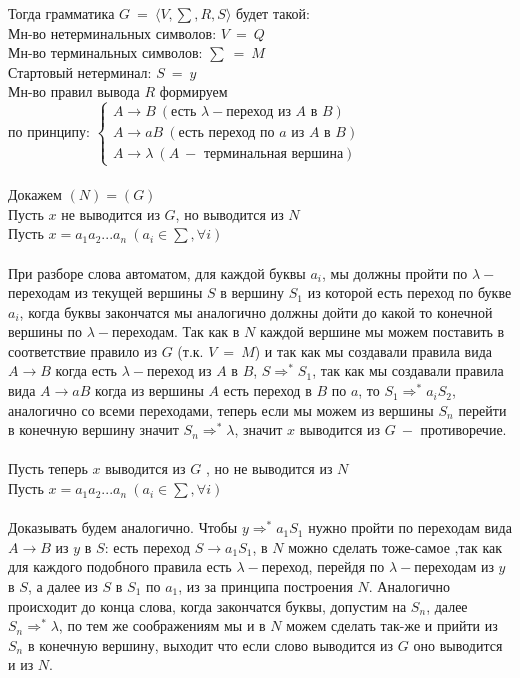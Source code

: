 \documentclass[10pt]{article}
\begin{document}
{\begin{enumerate}
		Тогда грамматика $G\ =\ \langle V,\sum,R,S\rangle$ будет такой:\\
		Мн-во нетерминальных символов: $V\ =\ Q$\\
		Мн-во терминальных символов: $\sum\ =\ M$\\
		Стартовый нетерминал: $S\ =\ y$\\
		Мн-во правил вывода $R$ формируем\\по принципу: $\begin{cases} A\rightarrow B\ (\text{есть }\lambda-\text{переход из }A\text{ в }B)\\A\rightarrow aB\ (\text{есть переход по } a\text{ из }A\text{ в }B)\\A\rightarrow\lambda\ (A\ -\text{ терминальная вершина}) \end{cases}$\\\\
		Докажем $(N)=(G)$\\
		Пусть $x$ не выводится из $G$, но выводится из $N$\\
		Пусть $x=a_1a_2...a_n\ (a_i \in \sum, \forall i)$\\\\
		При разборе слова автоматом, для каждой буквы $a_i$, мы должны пройти по $\lambda-$переходам из текущей вершины $S$ в вершину $S_1$ из которой есть переход по букве $a_i$, когда буквы закончатся мы аналогично должны дойти до какой то конечной вершины по $\lambda-$переходам.
		Так как в $N$ каждой вершине мы можем поставить в соответствие правило из $G$ (т.к. $V\ =\ M$) и так как мы создавали правила вида $A\rightarrow B$ когда есть $\lambda-$переход из $A$ в $B$, $S\Rightarrow^*S_1$, так как мы создавали правила вида $A\rightarrow aB$ когда из вершины $A$ есть переход в $B$ по $a$, то $S_1\Rightarrow^*a_iS_2$, аналогично со всеми переходами, теперь если мы можем из вершины $S_n$ перейти в конечную вершину значит $S_n\Rightarrow^*\lambda$, значит $x$ выводится из $G\ -$ противоречие.\\\\
		Пусть теперь $x$ выводится из $G$ , но не выводится из $N$\\
		Пусть $x=a_1a_2...a_n\ (a_i \in \sum, \forall i)$\\\\
		Доказывать будем аналогично. Чтобы $y\Rightarrow^*a_1S_1$ нужно пройти по переходам вида $A\rightarrow B$ из $y$ в $S$: есть переход $S\rightarrow a_1S_1$, в $N$ можно сделать тоже-самое ,так как для каждого подобного правила есть $\lambda-$переход, перейдя по $\lambda-$переходам из $y$ в $S$, а далее из $S$ в $S_1$ по $a_1$, из за принципа построения $N$. Аналогично происходит до конца слова, когда закончатся буквы, допустим на $S_n$, далее $S_n\Rightarrow^*\lambda$, по тем же соображениям мы и в $N$ можем сделать так-же и прийти из $S_n$ в конечную вершину, выходит что если слово выводится из $G$ оно выводится и из $N$.\\\\

\end{enumerate}}
\end{document}
